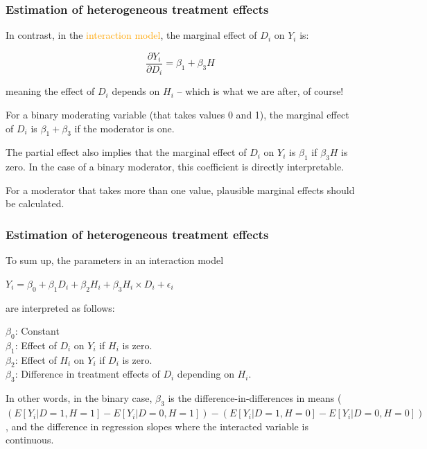 \documentclass[12pt,english,dvipsnames,aspectratio=169,handout]{beamer}\usepackage[]{graphicx}\usepackage[]{xcolor}
\begin{document}
\begin{frame}
  \frametitle{Estimation of heterogeneous treatment effects}
\footnotesize

In contrast, in the \textcolor{orange}{interaction model}, the marginal effect of $D_i$ on $Y_i$ is:	

\begin{equation*}
\frac{\partial Y_i}{\partial D_i} = \beta_1 + \beta_3 H
\end{equation*}

meaning the effect of $D_i$ depends on $H_i$ -- which is what we are after, of course!

For a binary moderating variable (that takes values 0 and 1), the marginal effect of $D_i$ is $\beta_1 + \beta_3$ if the moderator is one.

The partial effect also implies that the marginal effect of $D_i$ on $Y_i$ is $\beta_1$ if $\beta_3 H$ is zero. In the case of a binary moderator, this coefficient is directly interpretable.

For a moderator that takes more than one value, plausible marginal effects should be calculated.

\end{frame}



\begin{frame}
  \frametitle{Estimation of heterogeneous treatment effects}
\footnotesize
To sum up, the parameters in an interaction model

$Y_i = \beta_0 + \beta_1 D_i + \beta_2 H_i + \beta_3 H_i \times D_i + \epsilon_i$

are interpreted as follows:

\scriptsize
$\beta_0$: Constant\\
$\beta_1$: Effect of $D_i$ on $Y_i$ if $H_i$ is zero.\\
$\beta_2$: Effect of $H_i$ on $Y_i$ if $D_i$ is zero.\\ 
$\beta_3$: Difference in treatment effects of $D_i$ depending on $H_i$.
\vspace{5mm}

In other words, in the binary case, $\beta_3$ is the difference-in-differences in means ($(E[Y_i|D=1,H=1] - E[Y_i|D=0,H=1]) - (E[Y_i|D=1,H=0] - E[Y_i|D=0,H=0])$, and the difference in regression slopes where the interacted variable is continuous.

\end{frame}
\end{document}
